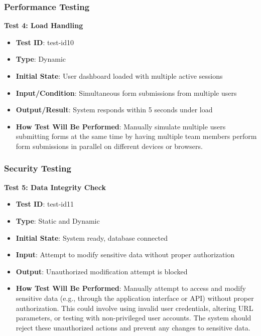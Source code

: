 \documentclass[12pt, titlepage]{article}
\begin{document}
\subsubsection{Performance Testing}

\textbf{Test 4: Load Handling}
\begin{itemize}
    \item \textbf{Test ID}: test-id10
    \item \textbf{Type}: Dynamic
    \item \textbf{Initial State}: User dashboard loaded with multiple active sessions
    \item \textbf{Input/Condition}: Simultaneous form submissions from multiple users
    \item \textbf{Output/Result}: System responds within 5 seconds under load
    \item \textbf{How Test Will Be Performed}: Manually simulate multiple users submitting forms at the same time by having multiple team members perform form submissions in parallel on different devices or browsers.
\end{itemize}

\subsubsection{Security Testing}

\textbf{Test 5: Data Integrity Check}
\begin{itemize}
    \item \textbf{Test ID}: test-id11
    \item \textbf{Type}: Static and Dynamic
    \item \textbf{Initial State}: System ready, database connected
    \item \textbf{Input}: Attempt to modify sensitive data without proper authorization
    \item \textbf{Output}: Unauthorized modification attempt is blocked
    \item \textbf{How Test Will Be Performed}: Manually attempt to access and modify sensitive data (e.g., through the application interface or API) without proper authorization. This could involve using invalid user credentials, altering URL parameters, or testing with non-privileged user accounts. The system should reject these unauthorized actions and prevent any changes to sensitive data.

\end{itemize}
\end{document}
